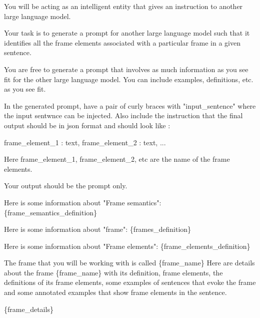 You will be acting as an intelligent entity that gives an instruction to another large language model.

Your task is to generate a prompt for another large language model such that it identifies all the frame elements
associated with a particular frame in a given sentence.

You are free to generate a prompt that involves as much information as you see fit for the other large language
model. You can include examples, definitions, etc. as you see fit.

In the generated prompt, have a pair of curly braces with "input\_sentence" where 
the input sentwnce can be injected. Also include the instruction that the final output should be in json
format and should look like :


    frame\_element\_1 : text,
    frame\_element\_2 : text,
    ...


Here frame\_element\_1, frame\_element\_2, etc are the name of the frame elements.

Your output should be the prompt only.

Here is some information about "Frame semantics":
\{frame\_semantics\_definition\}

Here is some information about "frame":
\{frames\_definition\}

Here is some information about "Frame elements":
\{frame\_elements\_definition\}

The frame that you will be working with is called \{frame\_name\}
Here are details about the frame \{frame\_name\} with its definition, frame elements, the definitions of its frame elements, some examples of sentences that evoke the frame and some annotated examples that show frame elements
in the sentence.

\{frame\_details\}